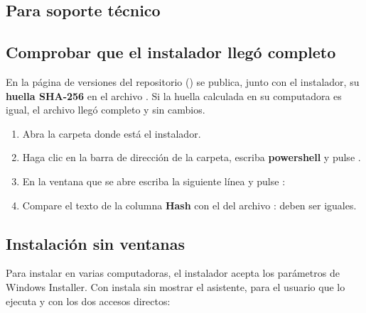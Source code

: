 \begin{anexo}
\section{Para soporte técnico}

\subsection{Comprobar que el instalador llegó completo}
\label{sec:huella}

En la página de versiones del repositorio (\href{\enlaceversiones}{\ruta{\enlaceversiones}}) se publica, junto con el instalador, su \textbf{huella SHA-256} en el archivo .
Si la huella calculada en su computadora es igual, el archivo llegó completo y sin cambios.

\begin{enumerate}
	\item Abra la carpeta donde está el instalador.
	\item Haga clic en la barra de dirección de la carpeta, escriba \textbf{powershell} y pulse .
	\item En la ventana que se abre escriba la siguiente línea y pulse :

	\begin{center}
	\end{center}

	\item Compare el texto de la columna \textbf{Hash} con el del archivo : deben ser iguales.
\end{enumerate}

\subsection{Instalación sin ventanas}

Para instalar en varias computadoras, el instalador acepta los parámetros de Windows Installer. Con  instala
sin mostrar el asistente, para el usuario que lo ejecuta y con los dos accesos directos:

\begin{center}
\end{center}


\end{anexo}
